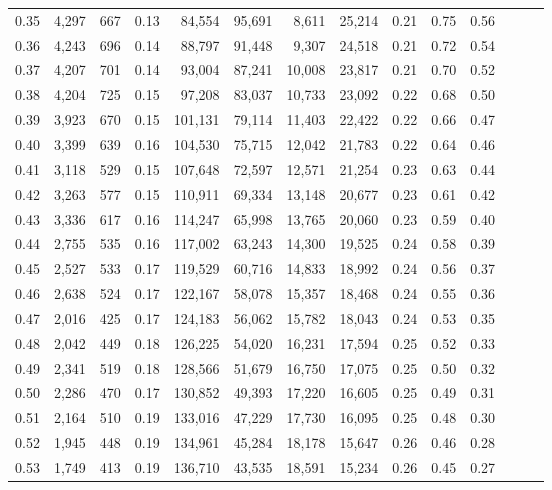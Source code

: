 \begin{tabular}{rrrrrrrrrrrrrr}
0.35 &  4,297 &  667 &  0.13 &   84,554 &   95,691 &   8,611 &  25,214 &  0.21 &  0.75 &      0.56 \\
0.36 &  4,243 &  696 &  0.14 &   88,797 &   91,448 &   9,307 &  24,518 &  0.21 &  0.72 &      0.54 \\
0.37 &  4,207 &  701 &  0.14 &   93,004 &   87,241 &  10,008 &  23,817 &  0.21 &  0.70 &      0.52 \\
0.38 &  4,204 &  725 &  0.15 &   97,208 &   83,037 &  10,733 &  23,092 &  0.22 &  0.68 &      0.50 \\
0.39 &  3,923 &  670 &  0.15 &  101,131 &   79,114 &  11,403 &  22,422 &  0.22 &  0.66 &      0.47 \\
0.40 &  3,399 &  639 &  0.16 &  104,530 &   75,715 &  12,042 &  21,783 &  0.22 &  0.64 &      0.46 \\
0.41 &  3,118 &  529 &  0.15 &  107,648 &   72,597 &  12,571 &  21,254 &  0.23 &  0.63 &      0.44 \\
0.42 &  3,263 &  577 &  0.15 &  110,911 &   69,334 &  13,148 &  20,677 &  0.23 &  0.61 &      0.42 \\
0.43 &  3,336 &  617 &  0.16 &  114,247 &   65,998 &  13,765 &  20,060 &  0.23 &  0.59 &      0.40 \\
0.44 &  2,755 &  535 &  0.16 &  117,002 &   63,243 &  14,300 &  19,525 &  0.24 &  0.58 &      0.39 \\
0.45 &  2,527 &  533 &  0.17 &  119,529 &   60,716 &  14,833 &  18,992 &  0.24 &  0.56 &      0.37 \\
0.46 &  2,638 &  524 &  0.17 &  122,167 &   58,078 &  15,357 &  18,468 &  0.24 &  0.55 &      0.36 \\
0.47 &  2,016 &  425 &  0.17 &  124,183 &   56,062 &  15,782 &  18,043 &  0.24 &  0.53 &      0.35 \\
0.48 &  2,042 &  449 &  0.18 &  126,225 &   54,020 &  16,231 &  17,594 &  0.25 &  0.52 &      0.33 \\
0.49 &  2,341 &  519 &  0.18 &  128,566 &   51,679 &  16,750 &  17,075 &  0.25 &  0.50 &      0.32 \\
0.50 &  2,286 &  470 &  0.17 &  130,852 &   49,393 &  17,220 &  16,605 &  0.25 &  0.49 &      0.31 \\
0.51 &  2,164 &  510 &  0.19 &  133,016 &   47,229 &  17,730 &  16,095 &  0.25 &  0.48 &      0.30 \\
0.52 &  1,945 &  448 &  0.19 &  134,961 &   45,284 &  18,178 &  15,647 &  0.26 &  0.46 &      0.28 \\
0.53 &  1,749 &  413 &  0.19 &  136,710 &   43,535 &  18,591 &  15,234 &  0.26 &  0.45 &      0.27 \\

\end{tabular}
